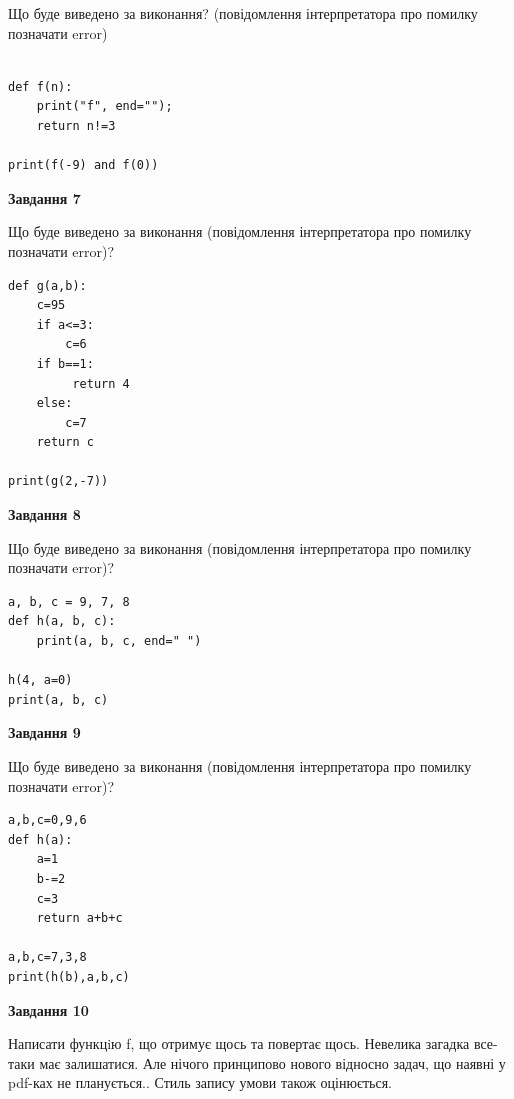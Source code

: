 \documentclass[12pt, ukrainian]{article}
\begin{document}
{\begin {large}
Що буде виведено за виконання? (повідомлення інтерпретатора про помилку позначати error)\par
\begin{verbatim}

def f(n):
    print("f", end="");
    return n!=3

print(f(-9) and f(0))
\end{verbatim}

{\begin {center}\textbf{Завдання 7}\end {center}}

Що буде виведено за виконання (повідомлення інтерпретатора про помилку позначати error)?\par
\begin{verbatim}
def g(a,b):
    c=95
    if a<=3:
        c=6
    if b==1:
         return 4
    else: 
        c=7
    return c

print(g(2,-7))
\end{verbatim}

{\begin {center}\textbf{Завдання 8}\end {center}}

Що буде виведено за виконання (повідомлення інтерпретатора про помилку позначати error)?\par
\begin{verbatim}
a, b, c = 9, 7, 8
def h(a, b, c):
    print(a, b, c, end=" ")

h(4, a=0)
print(a, b, c)
\end{verbatim}

{\begin {center}\textbf{Завдання 9}\end {center}}

Що буде виведено за виконання (повідомлення інтерпретатора про помилку позначати error)?\par
\begin{verbatim}
a,b,c=0,9,6
def h(a):
    a=1
    b-=2
    c=3
    return a+b+c

a,b,c=7,3,8
print(h(b),a,b,c)
\end{verbatim}

{\begin {center}\textbf{Завдання 10}\end {center}}


Написати функцiю f, що отримує щось та повертає щось. Невелика загадка все-таки має залишатися. Але нічого принципово нового відносно задач, що наявні у pdf-ках не планується.. Стиль запису умови також оцінюється.\par
\end {large}}
\newpage
\end{document}
